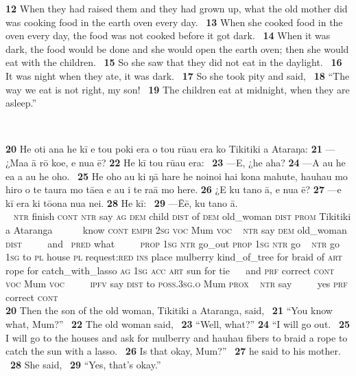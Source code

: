 {\medskip\glt
\textbf{\textup{12}} When they had raised them and they had grown up, what the old mother did was cooking food in the earth oven every day. ~\textbf{\textup{13}} When she cooked food in the oven every day, the food was not cooked before it got dark. ~\textbf{\textup{14}} When it was dark, the food would be done and she would open the earth oven; then she would eat with the children. ~\textbf{\textup{15}} So she saw that they did not eat in the daylight. ~\textbf{\textup{16}} It was night when they ate, it was dark. ~\textbf{\textup{17}} So she took pity and said, ~\textbf{\textup{18}} “The way we eat is not right, my son! ~\textbf{\textup{19}} The children eat at midnight, when they are asleep.”


~

\bigskip\gll
\textbf{\textup{20}} He oti {\ꞌ}ana he kī e tou poki era o tou rū{\ꞌ}au era ko Tikitiki {\ꞌ}a {\ꞌ}Ataraŋa: \textbf{\textup{21}} —¿Ma{\ꞌ}a {\ꞌ}ā rō koe, e nua ē? \textbf{\textup{22}} He kī tou rū{\ꞌ}au era: ~\textbf{\textup{23}} —{\ꞌ}E, ¿he aha? \textbf{\textup{24}} —A au he e{\ꞌ}a a au he oho. ~\textbf{\textup{25}} He oho au ki ŋā hare he no{\ꞌ}ino{\ꞌ}i hai kona mahute, hauhau mo hiro o te taura mo tāea e au i te ra{\ꞌ}ā mo here. \textbf{\textup{26}} ¿{\ꞌ}E ku tano {\ꞌ}ā, e nua ē? \textbf{\textup{27}} —e kī era ki tō{\ꞌ}ona nua nei. \textbf{\textup{28}} He kī: ~\textbf{\textup{29}} —{\ꞌ}\=Eē, ku tano {\ꞌ}ā.\\
~ \textsc{ntr} finish \textsc{cont} \textsc{ntr} say \textsc{ag} \textsc{dem} child \textsc{dist} of \textsc{dem} old\_woman \textsc{dist} \textsc{prom} Tikitiki a Ataranga ~ ~~~~know \textsc{cont} \textsc{emph} \textsc{2sg} \textsc{voc} Mum \textsc{voc}  ~ \textsc{ntr} say \textsc{dem} old\_woman \textsc{dist} ~ ~~~and ~\textsc{pred} what ~ ~~~\textsc{prop} \textsc{1sg} \textsc{ntr} go\_out \textsc{prop} \textsc{1sg} \textsc{ntr} go ~ \textsc{ntr} go \textsc{1sg} to \textsc{pl} house \textsc{pl} request:\textsc{red} \textsc{ins} place mulberry kind\_of\_tree for braid of \textsc{art} rope for catch\_with\_lasso \textsc{ag} \textsc{1sg} \textsc{acc} \textsc{art} sun for tie ~ ~and \textsc{prf} correct \textsc{cont} \textsc{voc} Mum \textsc{voc} ~ ~~~\textsc{ipfv} say \textsc{dist} to \textsc{poss.3sg.o} Mum \textsc{prox} ~ \textsc{ntr} say ~ ~~~yes \textsc{prf} correct \textsc{cont}\\

\medskip\glt
\textbf{\textup{20}} Then the son of the old woman, Tikitiki a Ataranga, said, ~\textbf{\textup{21}} “You know what, Mum?” ~\textbf{\textup{22}} The old woman said, ~\textbf{\textup{23}} “Well, what?” \textbf{\textup{24}} “I will go out. ~\textbf{\textup{25}} I will go to the houses and ask for mulberry and hauhau fibers to braid a rope to catch the sun with a lasso. ~\textbf{\textup{26}} Is that okay, Mum?” ~\textbf{\textup{27}} he said to his mother. ~\textbf{\textup{28}} She said, ~\textbf{\textup{29}} “Yes, that’s okay.”

}
